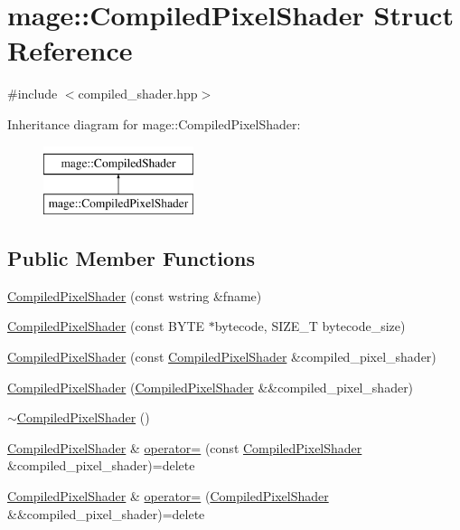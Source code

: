 \hypertarget{structmage_1_1_compiled_pixel_shader}{}\section{mage\+:\+:Compiled\+Pixel\+Shader Struct Reference}
\label{structmage_1_1_compiled_pixel_shader}


{\ttfamily \#include $<$compiled\+\_\+shader.\+hpp$>$}

Inheritance diagram for mage\+:\+:Compiled\+Pixel\+Shader\+:\begin{figure}[H]
\begin{center}
\leavevmode
\includegraphics[height=2.000000cm]{structmage_1_1_compiled_pixel_shader}
\end{center}
\end{figure}
\subsection*{Public Member Functions}
\begin{DoxyCompactItemize}
\item 
\hyperlink{structmage_1_1_compiled_pixel_shader_a1c8cc509e405a53456dff36c204ec353}{Compiled\+Pixel\+Shader} (const wstring \&fname)
\item 
\hyperlink{structmage_1_1_compiled_pixel_shader_a0952d4118e0d7d259b6034a52182ed6c}{Compiled\+Pixel\+Shader} (const B\+Y\+TE $\ast$bytecode, S\+I\+Z\+E\+\_\+T bytecode\+\_\+size)
\item 
\hyperlink{structmage_1_1_compiled_pixel_shader_a3bf30a1885ff8244f7f6c755cc68366a}{Compiled\+Pixel\+Shader} (const \hyperlink{structmage_1_1_compiled_pixel_shader}{Compiled\+Pixel\+Shader} \&compiled\+\_\+pixel\+\_\+shader)
\item 
\hyperlink{structmage_1_1_compiled_pixel_shader_a512dada64de6fa3ebf31a096da80904d}{Compiled\+Pixel\+Shader} (\hyperlink{structmage_1_1_compiled_pixel_shader}{Compiled\+Pixel\+Shader} \&\&compiled\+\_\+pixel\+\_\+shader)
\item 
\hyperlink{structmage_1_1_compiled_pixel_shader_a2121a916b6b1fe1b36aadb136f6b4219}{$\sim$\+Compiled\+Pixel\+Shader} ()
\item 
\hyperlink{structmage_1_1_compiled_pixel_shader}{Compiled\+Pixel\+Shader} \& \hyperlink{structmage_1_1_compiled_pixel_shader_a0dde38701c2e15a52d5d80f992a32551}{operator=} (const \hyperlink{structmage_1_1_compiled_pixel_shader}{Compiled\+Pixel\+Shader} \&compiled\+\_\+pixel\+\_\+shader)=delete
\item 
\hyperlink{structmage_1_1_compiled_pixel_shader}{Compiled\+Pixel\+Shader} \& \hyperlink{structmage_1_1_compiled_pixel_shader_a347557ae3d91dd0d561c56bc2c811a2f}{operator=} (\hyperlink{structmage_1_1_compiled_pixel_shader}{Compiled\+Pixel\+Shader} \&\&compiled\+\_\+pixel\+\_\+shader)=delete
\end{DoxyCompactItemize}


